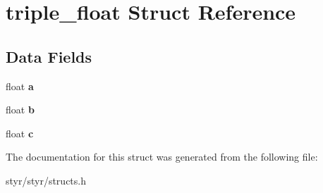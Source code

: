\hypertarget{structtriple__float}{}\section{triple\+\_\+float Struct Reference}
\label{structtriple__float}
\subsection*{Data Fields}
\begin{DoxyCompactItemize}
\item 
float {\bfseries a}\hypertarget{structtriple__float_a4aec1a5be9d9a4a394a2e49e9744286e}{}\label{structtriple__float_a4aec1a5be9d9a4a394a2e49e9744286e}

\item 
float {\bfseries b}\hypertarget{structtriple__float_a83fc1af92e29717b4513d121b0c72c7d}{}\label{structtriple__float_a83fc1af92e29717b4513d121b0c72c7d}

\item 
float {\bfseries c}\hypertarget{structtriple__float_ae78103ab33f03590e84ff7bc735629d7}{}\label{structtriple__float_ae78103ab33f03590e84ff7bc735629d7}

\end{DoxyCompactItemize}


The documentation for this struct was generated from the following file\+:\begin{DoxyCompactItemize}
\item 
styr/styr/structs.\+h\end{DoxyCompactItemize}
